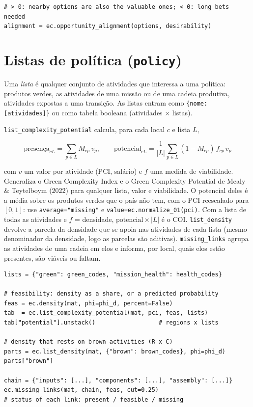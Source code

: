 \documentclass[12pt, a4paper]{article}
\newcommand{\fn}[1]{\texttt{#1}}
\begin{document}
\begin{lstlisting}[caption={Alinhamento entre viabilidade e desejabilidade}]
# > 0: nearby options are also the valuable ones; < 0: long bets needed
alignment = ec.opportunity_alignment(options, desirability)
\end{lstlisting}

\section{Listas de pol\'{i}tica (\texttt{policy})}

Uma \emph{lista} \'{e} qualquer conjunto de atividades que interessa a
uma pol\'{i}tica: produtos verdes, as atividades de uma miss\~{a}o ou de
uma cadeia produtiva, atividades expostas a uma transi\c{c}\~{a}o. As
listas entram como \texttt{\{nome: [atividades]\}} ou como tabela
booleana (atividades $\times$ listas).

\fn{list\_complexity\_potential} calcula, para cada local $c$ e lista
$L$,

\[
  \text{presen\c{c}a}_{cL} = \sum_{p \in L} M_{cp}\,v_p, \qquad
  \text{potencial}_{cL} = \frac{1}{|L|} \sum_{p \in L} (1 - M_{cp})\,f_{cp}\,v_p
\]

\begin{sloppypar}
com $v$ um valor por atividade (PCI, sal\'{a}rio) e $f$ uma medida de
viabilidade. Generaliza o Green Complexity Index e o Green Complexity
Potential de Mealy \& Teytelboym (2022) para qualquer lista, valor e
viabilidade. O potencial deles \'{e} a m\'{e}dia sobre os produtos verdes
que o pa\'{i}s n\~{a}o tem, com o PCI reescalado para $[0,1]$: use
\texttt{average="missing"} e \texttt{value=ec.normalize\_01(pci)}. Com a
lista de todas as atividades e $f$ = densidade,
$\text{potencial} \times |L|$ \'{e} o COI. \fn{list\_density} devolve a
parcela da densidade que se apoia nas atividades de cada lista (mesmo
denominador da densidade, logo as parcelas s\~{a}o aditivas).
\fn{missing\_links} agrupa as atividades de uma cadeia em elos e informa,
por local, quais elos est\~{a}o presentes, s\~{a}o vi\'{a}veis ou faltam.
\end{sloppypar}

\begin{lstlisting}[caption={Indicadores para listas de atividades}]
lists = {"green": green_codes, "mission_health": health_codes}

# feasibility: density as a share, or a predicted probability
feas = ec.density(mat, phi=phi_d, percent=False)
tab  = ec.list_complexity_potential(mat, pci, feas, lists)
tab["potential"].unstack()                  # regions x lists

# density that rests on brown activities (R x C)
parts = ec.list_density(mat, {"brown": brown_codes}, phi=phi_d)
parts["brown"]

chain = {"inputs": [...], "components": [...], "assembly": [...]}
ec.missing_links(mat, chain, feas, cut=0.25)
# status of each link: present / feasible / missing
\end{lstlisting}
\end{document}
